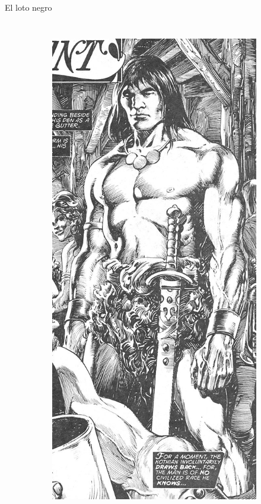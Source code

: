 \begin{frame}{El loto negro}
\begin{columns}
\begin{figure}[htp]
\begin{subfigure}[b]{0.23\textwidth}
				\includegraphics[width=\textwidth]{img/conan/TSSC}
			\end{subfigure}
		\end{figure}
	\end{columns}
\end{frame}
\note[itemize]{
	\item
}

